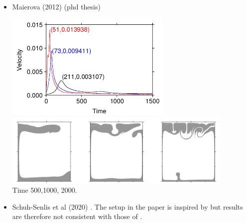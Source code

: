\begin{itemize}
\item Maierova (2012) \cite{maie12} (phd thesis)

\begin{center}
\includegraphics[width=8cm]{images/benchmark_vaks97/maie12_b}
\includegraphics[width=11cm]{images/benchmark_vaks97/maie12_a}\\
{\captionfont Time 500,1000, 2000.}
\end{center}


\item Schuh-Senlis et al (2020) \cite{sctc20}. The setup in the paper is inspired 
by \cite{vaks97} but results are therefore not consistent with those of \cite{vaks97}.


\end{itemize}
